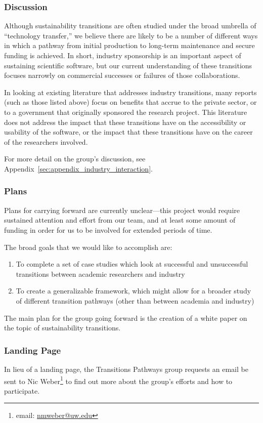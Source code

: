 \subsubsection{Discussion}

Although sustainability transitions are often studied under the broad umbrella of ``technology
transfer,'' we believe there are likely to be a number of different ways in which
a pathway from initial production to long-term maintenance and secure funding is
achieved. In short, industry sponsorship is an important aspect of sustaining
scientific software, but our current understanding of these transitions focuses
narrowly on commercial successes or failures of those collaborations.

In looking at existing literature that addresses industry transitions, many
reports (such as those listed above) focus on benefits that accrue to the private sector, or to a government
that originally sponsored the research project. This literature does not address
the impact that these transitions have on the accessibility or usability of the
software, or the impact that these transitions have on the career of the
researchers involved.

For more detail on the group's discussion, see
Appendix~\ref{sec:appendix_industry_interaction}.

\subsubsection{Plans}

Plans for carrying forward are currently unclear---this project would require
sustained attention and effort from our team, and at least some amount of
funding in order for us to be involved for extended periods of time.

The broad goals that we would like to accomplish are: 

\begin{enumerate}
\item To complete a set of case studies which look at successful and unsuccessful transitions between academic researchers and industry
\item To create a generalizable framework, which might allow for a broader study of different transition pathways (other than between academia and industry)
\end{enumerate}

The main plan for the group going forward is the creation of a white paper on the topic of sustainability transitions. 

\subsubsection{Landing Page}

In lieu of a landing page, the Transitions Pathways
group requests an email be sent to Nic Weber\footnote{email: 
\href{mailto:nmweber@uw.edu}{nmweber@uw.edu}} to find out more
about the group's efforts and how to participate.